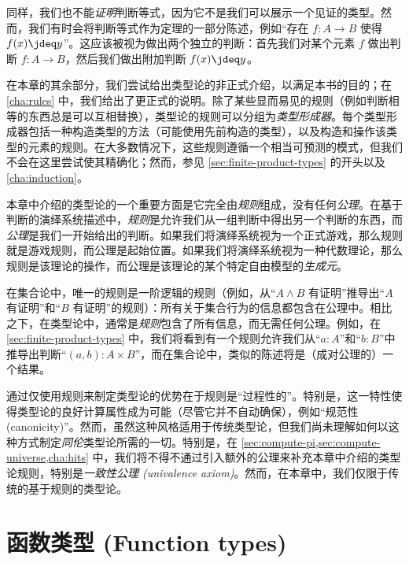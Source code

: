 同样，我们也不能\emph{证明}判断等式，因为它不是我们可以展示一个见证的类型。然而，我们有时会将判断等式作为定理的一部分陈述，例如“存在 $f:A\to B$ 使得 $f(x)\jdeq y$”。这应该被视为做出两个独立的判断：首先我们对某个元素 $f$ 做出判断 $f:A\to B$，然后我们做出附加判断 $f(x)\jdeq y$。

在本章的其余部分，我们尝试给出类型论的非正式介绍，以满足本书的目的；在 \cref{cha:rules} 中，我们给出了更正式的说明。除了某些显而易见的规则（例如判断相等的东西总是可以互相替换），类型论的规则可以分组为\emph{类型形成器}。每个类型形成器包括一种构造类型的方法（可能使用先前构造的类型），以及构造和操作该类型的元素的规则。在大多数情况下，这些规则遵循一个相当可预测的模式，但我们不会在这里尝试使其精确化；然而，参见 \cref{sec:finite-product-types} 的开头以及 \cref{cha:induction}。

%
%
本章中介绍的类型论的一个重要方面是它完全由\emph{规则}组成，没有任何\emph{公理}。在基于判断的演绎系统描述中，\emph{规则}是允许我们从一组判断中得出另一个判断的东西，而\emph{公理}是我们一开始给出的判断。如果我们将演绎系统视为一个正式游戏，那么规则就是游戏规则，而公理是起始位置。如果我们将演绎系统视为一种代数理论，那么规则是该理论的操作，而公理是该理论的某个特定自由模型的\emph{生成元}。

在集合论中，唯一的规则是一阶逻辑的规则（例如，从“$A\wedge B$ 有证明”推导出“$A$ 有证明”和“$B$ 有证明”的规则）：所有关于集合行为的信息都包含在公理中。相比之下，在类型论中，通常是\emph{规则}包含了所有信息，而无需任何公理。例如，在 \cref{sec:finite-product-types} 中，我们将看到有一个规则允许我们从“$a:A$”和“$b:B$”中推导出判断“$(a,b):A\times B$”，而在集合论中，类似的陈述将是（成对公理的）一个结果。

通过仅使用规则来制定类型论的优势在于规则是“过程性的”。特别是，这一特性使得类型论的良好计算属性成为可能（尽管它并不自动确保），例如“规范性 (canonicity)”。然而，虽然这种风格适用于传统类型论，但我们尚未理解如何以这种方式制定\emph{同伦}类型论所需的一切。特别是，在 \cref{sec:compute-pi,sec:compute-universe,cha:hits} 中，我们将不得不通过引入额外的公理来补充本章中介绍的类型论规则，特别是\emph{一致性公理 (univalence axiom)}。然而，在本章中，我们仅限于传统的基于规则的类型论。

\section{函数类型 (Function types)}
\label{sec:function-types}

